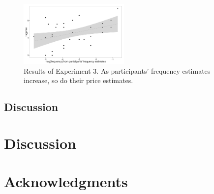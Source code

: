 \documentclass[10pt,letterpaper]{article}
\begin{document}
\begin{figure}[ht]
\begin{center}
\includegraphics[width=0.48\textwidth]{analysis_files_for_writeup/images/exp3-scatterplot.png}
\end{center}
\caption{Results of Experiment 3. As participants' frequency estimates increase, so do their price estimates.} 
\label{exp3-scatterplot}
\end{figure}

\subsection{Discussion}


\section{Discussion}


\section{Acknowledgments}

\nocite{web1t5gram}
\nocite{lewis}
\end{document}
